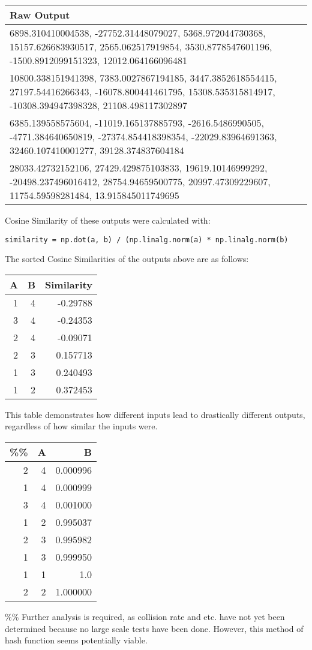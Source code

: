 \documentclass[letterpaper]{article}
\begin{document}
\begin{center}
\begin{tabular}{l}
Raw Output\\
\hline
6898.310410004538, -27752.31448079027, 5368.972044730368, 15157.626683930517, 2565.062517919854, 3530.8778547601196, -1500.8912099151323, 12012.064166096481\\
10800.338151941398, 7383.0027867194185, 3447.3852618554415, 27197.54416266343, -16078.800441461795, 15308.535315814917, -10308.394947398328, 21108.498117302897\\
6385.139558575604, -11019.165137885793, -2616.5486990505, -4771.384640650819, -27374.854418398354, -22029.83964691363, 32460.107410001277, 39128.374837604184\\
28033.42732152106, 27429.429875103833, 19619.10146999292, -20498.237496016412, 28754.94659500775, 20997.47309229607, 11754.59598281484, 13.915845011749695\\
\end{tabular}
\end{center}

Cosine Similarity of these outputs were calculated with:

\begin{verbatim}
similarity = np.dot(a, b) / (np.linalg.norm(a) * np.linalg.norm(b)
\end{verbatim}

The sorted Cosine Similarities of the outputs above are as follows:

\begin{center}
\begin{tabular}{rrr}
A & B & Similarity\\
\hline
1 & 4 & -0.29788\\
3 & 4 & -0.24353\\
2 & 4 & -0.09071\\
2 & 3 & 0.157713\\
1 & 3 & 0.240493\\
1 & 2 & 0.372453\\
\end{tabular}
\end{center}

This table demonstrates how different inputs lead to drastically
different outputs, regardless of how similar the inputs were.

\begin{center}
\begin{tabular}{rrr}
\%\% & A & B\\
\hline
2 & 4 & 0.000996\\
1 & 4 & 0.000999\\
3 & 4 & 0.001000\\
1 & 2 & 0.995037\\
2 & 3 & 0.995982\\
1 & 3 & 0.999950\\
1 & 1 & 1.0\\
2 & 2 & 1.000000\\
\end{tabular}
\end{center}

\%\% Further analysis is required, as collision rate and etc. have not yet
been determined because no large scale tests have been done. However,
this method of hash function seems potentially viable.
\end{document}
